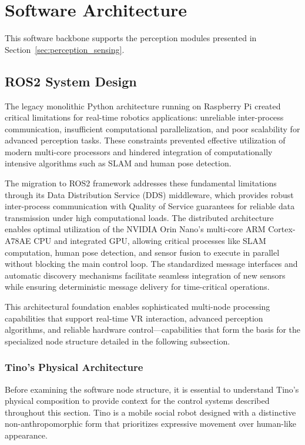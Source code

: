 
\section{Software Architecture}
\label{sec:software_arch}

This software backbone supports the perception modules presented in Section~\ref{sec:perception_sensing}.

\subsection{ROS2 System Design}

The legacy monolithic Python architecture running on Raspberry Pi created critical limitations for real-time robotics applications: unreliable inter-process communication, insufficient computational parallelization, and poor scalability for advanced perception tasks. These constraints prevented effective utilization of modern multi-core processors and hindered integration of computationally intensive algorithms such as SLAM and human pose detection.

The migration to ROS2 framework addresses these fundamental limitations through its Data Distribution Service (DDS) middleware, which provides robust inter-process communication with Quality of Service guarantees for reliable data transmission under high computational loads. The distributed architecture enables optimal utilization of the NVIDIA Orin Nano's multi-core ARM Cortex-A78AE CPU and integrated GPU, allowing critical processes like SLAM computation, human pose detection, and sensor fusion to execute in parallel without blocking the main control loop. The standardized message interfaces and automatic discovery mechanisms facilitate seamless integration of new sensors while ensuring deterministic message delivery for time-critical operations.

This architectural foundation enables sophisticated multi-node processing capabilities that support real-time VR interaction, advanced perception algorithms, and reliable hardware control—capabilities that form the basis for the specialized node structure detailed in the following subsection.

\subsubsection{Tino's Physical Architecture}

Before examining the software node structure, it is essential to understand Tino's physical composition to provide context for the control systems described throughout this section. Tino is a mobile social robot designed with a distinctive non-anthropomorphic form that prioritizes expressive movement over human-like appearance.

